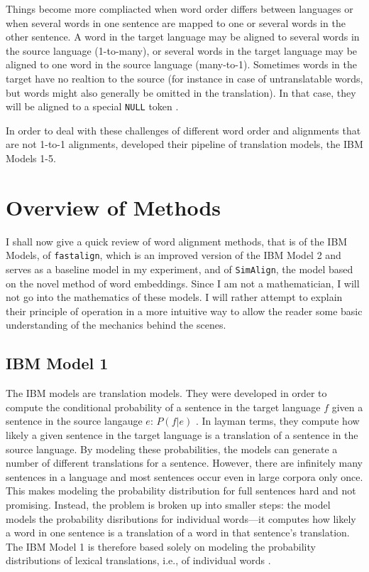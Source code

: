 Things become more compliacted when word order differs between languages or when several words in one sentence are mapped to one or several words in the other sentence. 
A word in the target language may be aligned to several words in the source language (1-to-many), or several words in the target language may be aligned to one word in the source language (many-to-1). 
Sometimes words in the target have no realtion to the source (for instance in case of untranslatable words, but words might also generally be omitted in the translation). 
In that case, they will be aligned to a special \texttt{NULL} token \autocite[85]{koehn2009}. 


In order to deal with these challenges of different word order and alignments that are not 1-to-1 alignments, \cite{brown-etal-1993-mathematics} developed their pipeline of translation models, the IBM Models 1-5.

\section{Overview of Methods}
I shall now give a quick review of word alignment methods, that is of the IBM Models, of \texttt{fastalign}, which is an improved version of the IBM Model 2 and serves as a baseline model in my experiment, and of \texttt{SimAlign}, the model based on the novel method of word embeddings. 
Since I am not a mathematician, I will not go into the mathematics of these models. 
I will rather attempt to explain their principle of operation in a more intuitive way to allow the reader some basic understanding of the mechanics behind the scenes.

\subsection{IBM Model 1}
The IBM models are translation models. 
They were developed in order to compute the conditional probability of a sentence in the target language $f$ given a sentence in the source langauge $e$: $P(f|e)$ \autocite{brown-etal-1993-mathematics}. 
In layman terms, they compute how likely a given sentence in the target language is a translation of a sentence in the source language.
By modeling these probabilities, the models can generate a number of different translations for a sentence. 
However, there are infinitely many sentences in a language and most sentences occur even in large corpora only once. 
This makes modeling the probability distribution for full sentences hard and not promising. 
Instead, the problem is broken up into smaller steps: the model models the probability disributions for individual words---it computes how likely a word in one sentence is a translation of a word in that sentence's translation. 
The IBM Model 1 is therefore based solely on modeling the probability distributions of lexical translations, i.e., of individual words \autocite[88]{koehn2009}.

